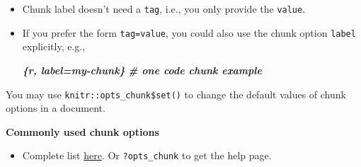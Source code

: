 \documentclass[
]{book}
\newenvironment{Shaded}{\begin{snugshade}}{\end{snugshade}}
\newcommand{\InformationTok}[1]{\textcolor[rgb]{0.56,0.35,0.01}{\textbf{\textit{#1}}}}
\providecommand{\tightlist}{%
  \setlength{\itemsep}{0pt}\setlength{\parskip}{0pt}}
\theoremstyle{definition}
\theoremstyle{definition}
\theoremstyle{definition}
\theoremstyle{definition}
\theoremstyle{remark}
\begin{document}
\begin{itemize}
\item
  Chunk label doesn't need a \texttt{tag}, i.e., you only provide the \texttt{value}.
\item
  If you prefer the form \texttt{tag=value}, you could also use the chunk option \texttt{label} explicitly, e.g.,

\begin{Shaded}
\begin{Highlighting}[]
\InformationTok{\textasciigrave{}\textasciigrave{}\textasciigrave{}\{r, label=\textquotesingle{}my{-}chunk\textquotesingle{}\}}
\InformationTok{\# one code chunk example}
\InformationTok{\textasciigrave{}\textasciigrave{}\textasciigrave{}}
\end{Highlighting}
\end{Shaded}
\end{itemize}

You may use \texttt{knitr::opts\_chunk\$set()} to change the default values of chunk options in a document.

\textbf{Commonly used chunk options}

\begin{itemize}
\tightlist
\item
  Complete list \href{https://yihui.org/knitr/options/}{here}. Or \texttt{?opts\_chunk} to get the help page.
\end{itemize}
\end{document}
